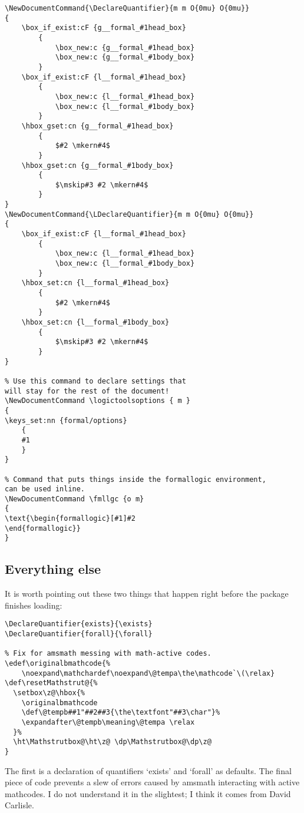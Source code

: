 \documentclass{article}
\begin{document}
\begin{Verbatim}
\NewDocumentCommand{\DeclareQuantifier}{m m O{0mu} O{0mu}}
{
    \box_if_exist:cF {g__formal_#1head_box} 
        {
            \box_new:c {g__formal_#1head_box}
            \box_new:c {g__formal_#1body_box}
        }
    \box_if_exist:cF {l__formal_#1head_box} 
        {
            \box_new:c {l__formal_#1head_box}
            \box_new:c {l__formal_#1body_box}
        }
    \hbox_gset:cn {g__formal_#1head_box} 
        {
            $#2 \mkern#4$
        }
    \hbox_gset:cn {g__formal_#1body_box} 
        {
            $\mskip#3 #2 \mkern#4$
        }
}
\NewDocumentCommand{\LDeclareQuantifier}{m m O{0mu} O{0mu}}
{
    \box_if_exist:cF {l__formal_#1head_box} 
        {
            \box_new:c {l__formal_#1head_box}
            \box_new:c {l__formal_#1body_box}
        }
    \hbox_set:cn {l__formal_#1head_box} 
        {
            $#2 \mkern#4$
        }
    \hbox_set:cn {l__formal_#1body_box} 
        {
            $\mskip#3 #2 \mkern#4$
        }
}

% Use this command to declare settings that
will stay for the rest of the document!
\NewDocumentCommand \logictoolsoptions { m }
{
\keys_set:nn {formal/options} 
    {
    #1 
    }
}

% Command that puts things inside the formallogic environment,
can be used inline.
\NewDocumentCommand \fmllgc {o m}
{
\text{\begin{formallogic}[#1]#2
\end{formallogic}}
}
\end{Verbatim}
\mbox{}
\subsection{Everything else}

\begin{center}
    \Large {}
\end{center}
\noindent It is worth pointing out these two things that happen right before the package finishes loading:
\begin{Verbatim}[firstnumber=1]
\DeclareQuantifier{exists}{\exists}
\DeclareQuantifier{forall}{\forall}

% Fix for amsmath messing with math-active codes.
\edef\originalbmathcode{%
    \noexpand\mathchardef\noexpand\@tempa\the\mathcode`\(\relax}
\def\resetMathstrut@{%
  \setbox\z@\hbox{%
    \originalbmathcode
    \def\@tempb##1"##2##3{\the\textfont"##3\char"}%
    \expandafter\@tempb\meaning\@tempa \relax
  }%
  \ht\Mathstrutbox@\ht\z@ \dp\Mathstrutbox@\dp\z@
}
\end{Verbatim}
The first is a declaration of quantifiers `exists' and `forall' as defaults. The final piece of code prevents a slew of errors caused by amsmath interacting with active mathcodes. I do not understand it in the slightest; I think it comes from David Carlisle.
\end{document}
